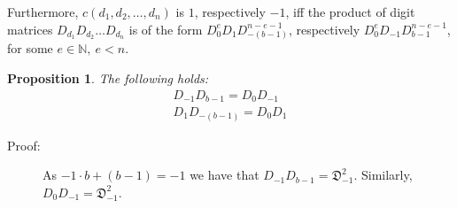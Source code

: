 \documentclass[11pt,a4paper]{article}
\newtheorem{prop}[tm]{Proposition}
\newenvironment{proof}
	{ \begin{description} \item[Proof:] \footnotesize }
	{ \end{description} }
\begin{document}
	Furthermore, $c(d_1,d_2,\ldots,d_n)$ is $1$, respectively $-1$, iff the
	product of digit matrices $D_{d_1} D_{d_2} \ldots D_{d_n}$ is of the form
	$D_0^e D_1 D_{-(b-1)}^{n-e-1}$, respectively $D_0^e D_{-1} D_{b-1}^{n-e-1}$,
	for some $e \in \mathbb{N},\ e < n$.
	\begin{prop} \label{prop:dneg db-1 = dzer dneg}
		The following holds:
		\[ \begin{array}{c}
			D_{-1} D_{b-1} = D_0 D_{-1} \\
			D_1 D_{-(b-1)} = D_0 D_1
		\end{array} \]
	\end{prop}
	\begin{proof}
		As $-1 \cdot b + (b-1) = -1$ we have that $D_{-1} D_{b-1} =
		\mathfrak{D}_{-1}^2$. Similarly, $D_0 D_{-1} = \mathfrak{D}_{-1}^2$.
	\end{proof}
\end{document}
